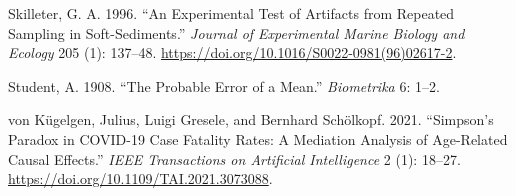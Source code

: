 \documentclass[
  letterpaper,
  DIV=11,
  numbers=noendperiod]{scrreprt}
\newlength{\cslhangindent}
\newenvironment{CSLReferences}[2] %
 {\begin{list}{}{%
  \setlength{\itemindent}{0pt}
  \setlength{\leftmargin}{0pt}
  \setlength{\parsep}{0pt}
  \ifodd #1
   \setlength{\leftmargin}{\cslhangindent}
   \setlength{\itemindent}{-1\cslhangindent}
  \fi
  \setlength{\itemsep}{#2\baselineskip}}}
 {\end{list}}
\begin{document}
\begin{CSLReferences}{1}{0}
Skilleter, G. A. 1996. {``An Experimental Test of Artifacts from
Repeated Sampling in Soft-Sediments.''} \emph{Journal of Experimental
Marine Biology and Ecology} 205 (1): 137--48.
\url{https://doi.org/10.1016/S0022-0981(96)02617-2}.

Student, A. 1908. {``The Probable Error of a Mean.''} \emph{Biometrika}
6: 1--2.

von Kügelgen, Julius, Luigi Gresele, and Bernhard Schölkopf. 2021.
{``Simpson's Paradox in COVID-19 Case Fatality Rates: A Mediation
Analysis of Age-Related Causal Effects.''} \emph{IEEE Transactions on
Artificial Intelligence} 2 (1): 18--27.
\url{https://doi.org/10.1109/TAI.2021.3073088}.

\end{CSLReferences}
\end{document}
